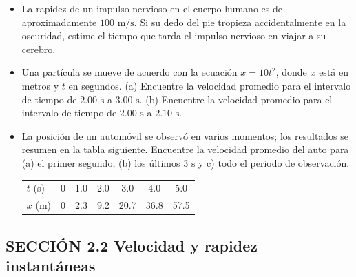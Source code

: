 \documentclass[11pt,a4paper]{article}
\begin{document}
\begin{itemize}
    \item[\textbf{1.}] La rapidez de un impulso nervioso en el cuerpo humano es de aproximadamente $100 \text{ m/s}$. Si su dedo del pie tropieza accidentalmente en la oscuridad, estime el tiempo que tarda el impulso nervioso en viajar a su cerebro.
    \vspace*{5cm}

    \item[\textbf{2.}] Una partícula se mueve de acuerdo con la ecuación $x = 10t^2$, donde $x$ está en metros y $t$ en segundos. (a) Encuentre la velocidad promedio para el intervalo de tiempo de $2.00 \text{ s}$ a $3.00 \text{ s}$. (b) Encuentre la velocidad promedio para el intervalo de tiempo de $2.00 \text{ s}$ a $2.10 \text{ s}$.
    \vspace*{6cm}

    \item[\textbf{3.}] La posición de un automóvil se observó en varios momentos; los resultados se resumen en la tabla siguiente. Encuentre la velocidad promedio del auto para (a) el primer segundo, (b) los últimos $3 \text{ s}$ y c) todo el periodo de observación.
    \begin{center}
    \begin{tabular}{lcccccc}
    \hline
    $t$ (s) & 0 & 1.0 & 2.0 & 3.0 & 4.0 & 5.0 \\
    $x$ (m) & 0 & 2.3 & 9.2 & 20.7 & 36.8 & 57.5 \\
    \hline
    \end{tabular}
    \end{center}
    \vspace*{6cm}
\end{itemize}

\newpage

\subsection*{SECCIÓN 2.2 Velocidad y rapidez instantáneas}
\end{document}
